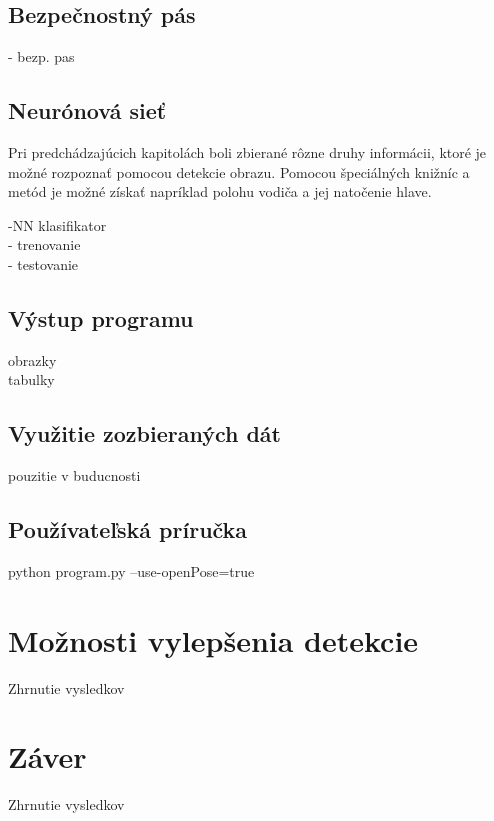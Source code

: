 \documentclass[slovak,master,dept460,male,cpp,cpdeclaration]{diploma}
\begin{document}
\newpage
\subsection{Bezpečnostný pás}
\label{sec:safeBelt}
- bezp. pas

\newpage
\subsection{Neurónová sieť}
\label{sec:neuralNetwork}
Pri predchádzajúcich kapitolách boli zbierané rôzne druhy informácii, ktoré je možné rozpoznať pomocou detekcie obrazu. Pomocou  špeciálných knižníc a metód  je možné získať napríklad  polohu vodiča a jej natočenie hlave. 

-NN klasifikator\\
- trenovanie \\
- testovanie

\newpage
\subsection{Výstup programu}
obrazky\\
tabulky


\newpage
\subsection{Využitie zozbieraných dát}
pouzitie v buducnosti


\newpage
\subsection{Používateľská príručka}
python program.py --use-openPose=true


\newpage
\section{Možnosti vylepšenia detekcie}
\label{sec:Možnosti vylepšenia detekcie}
Zhrnutie vysledkov


\newpage
\section{Záver}
\label{sec:Zaver}
Zhrnutie vysledkov








\end{document}
